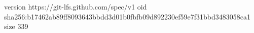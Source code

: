 version https://git-lfs.github.com/spec/v1
oid sha256:b17462ab89ff8093643bbdd3d01b0fbfb09d892230ef59e7f31bbd3483058ca1
size 339
